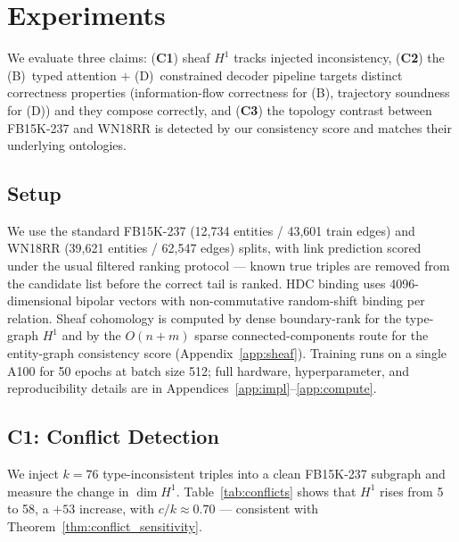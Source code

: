 \section{Experiments}
\label{sec:experiments}

We evaluate three claims: (\textbf{C1}) sheaf $H^1$ tracks injected
inconsistency, (\textbf{C2}) the (B)~typed attention $+$ (D)~constrained
decoder pipeline targets distinct correctness properties (information-flow
correctness for (B), trajectory soundness for (D)) and they compose
correctly, and (\textbf{C3}) the topology contrast between FB15K-237 and
WN18RR is detected by our consistency score and matches their underlying
ontologies.

\subsection{Setup}
We use the standard FB15K-237 (12,734 entities / 43,601 train edges) and
WN18RR (39,621 entities / 62,547 edges) splits, with link prediction
scored under the usual filtered ranking protocol --- known true triples
are removed from the candidate list before the correct tail is ranked.
HDC binding uses 4096-dimensional bipolar vectors with non-commutative
random-shift binding per relation. Sheaf cohomology is computed by dense
boundary-rank for the type-graph $H^1$ and by the $O(n+m)$ sparse
connected-components route for the entity-graph consistency score
(Appendix~\ref{app:sheaf}). Training runs on a single A100 for 50 epochs
at batch size 512; full hardware, hyperparameter, and reproducibility
details are in Appendices~\ref{app:impl}--\ref{app:compute}.

\subsection{C1: Conflict Detection}

We inject $k = 76$ type-inconsistent triples into a clean FB15K-237 subgraph and measure the change in $\dim H^1$.
Table~\ref{tab:conflicts} shows that $H^1$ rises from 5 to 58, a $+53$ increase, with $c/k \approx 0.70$ --- consistent with Theorem~\ref{thm:conflict_sensitivity}.

